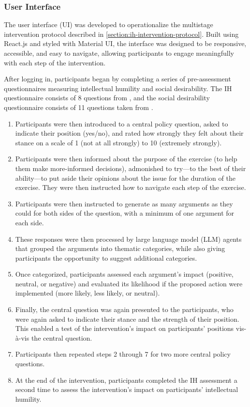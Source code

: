 \documentclass{scrartcl}
\begin{document}
\subsubsection{User Interface}
\label{section:user-interface}
The user interface (UI) was developed to operationalize the multistage intervention protocol described in \ref{section:ih-intervention-protocol}. Built using React.js and styled with Material UI, the interface was designed to be responsive, accessible, and easy to navigate, allowing participants to engage meaningfully with each step of the intervention.

After logging in, participants began by completing a series of pre-assessment questionnaires measuring intellectual humility and social desirability. The IH questionnaire consists of 8 questions from \citep{general-intellectual-humility}, and the social desirability questionnaire consists of 11 questions taken from \citep{social-desirability}.

\begin{enumerate}
    \item Participants were then introduced to a central policy question, asked to indicate their position (yes/no), and rated how strongly they felt about their stance on a scale of 1 (not at all strongly) to 10 (extremely strongly).
    \item Participants were then informed about the purpose of the exercise (to help them make more-informed decisions), admonished to try---to the best of their ability---to put aside their opinions about the issue for the duration of the exercise. They were then instructed how to navigate each step of the exercise.
    \item Participants were then instructed to generate as many arguments as they could for both sides of the question, with a minimum of one argument for each side.
    \item These responses were then processed by large language model (LLM) agents that grouped the arguments into thematic categories, while also giving participants the opportunity to suggest additional categories.
    \item Once categorized, participants assessed each argument's impact (positive, neutral, or negative) and evaluated its likelihood if the proposed action were implemented (more likely, less likely, or neutral).
    \item Finally, the central question was again presented to the participants, who were again asked to indicate their stance and the strength of their position. This enabled a test of the intervention's impact on participants' positions vis-\`a-vis the central question.
    \item Participants then repeated steps 2 through 7 for two more central policy questions.
    \item At the end of the intervention, participants completed the IH assessment a second time to assess the intervention's impact on participants' intellectual humility.
\end{enumerate}
\end{document}
